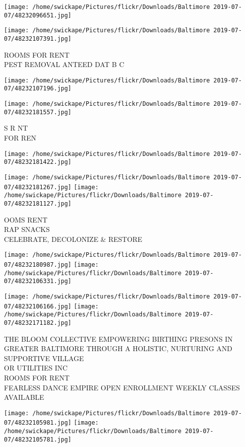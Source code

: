 \documentclass[10pt,letterpaper]{article}
\begin{document}
\texttt{[image: /home/swickape/Pictures/flickr/Downloads/Baltimore 2019-07-07/48232096651.jpg]}

\vspace{0.25in}
\texttt{[image: /home/swickape/Pictures/flickr/Downloads/Baltimore 2019-07-07/48232107391.jpg]}

ROOMS FOR RENT\\
PEST REMOVAL ANTEED DAT B C
\pagebreak

\texttt{[image: /home/swickape/Pictures/flickr/Downloads/Baltimore 2019-07-07/48232107196.jpg]}

\vspace{0.25in}
\texttt{[image: /home/swickape/Pictures/flickr/Downloads/Baltimore 2019-07-07/48232181557.jpg]}

S R NT\\
FOR REN
\pagebreak

\texttt{[image: /home/swickape/Pictures/flickr/Downloads/Baltimore 2019-07-07/48232181422.jpg]}

\vspace{0.25in}
\texttt{[image: /home/swickape/Pictures/flickr/Downloads/Baltimore 2019-07-07/48232181267.jpg]}
\texttt{[image: /home/swickape/Pictures/flickr/Downloads/Baltimore 2019-07-07/48232181127.jpg]}

OOMS RENT\\
RAP SNACKS\\
CELEBRATE, DECOLONIZE \& RESTORE
\pagebreak

\texttt{[image: /home/swickape/Pictures/flickr/Downloads/Baltimore 2019-07-07/48232180987.jpg]}
\texttt{[image: /home/swickape/Pictures/flickr/Downloads/Baltimore 2019-07-07/48232106331.jpg]}

\texttt{[image: /home/swickape/Pictures/flickr/Downloads/Baltimore 2019-07-07/48232106166.jpg]}
\texttt{[image: /home/swickape/Pictures/flickr/Downloads/Baltimore 2019-07-07/48232171182.jpg]}

THE BLOOM COLLECTIVE EMPOWERING BIRTHING PRESONS IN GREATER BALTIMORE THROUGH A HOLISTIC, NURTURING AND SUPPORTIVE VILLAGE\\
OR UTILITIES INC\\
ROOMS FOR RENT\\
FEARLESS DANCE EMPIRE OPEN ENROLLMENT WEEKLY CLASSES AVAILABLE
\pagebreak

\texttt{[image: /home/swickape/Pictures/flickr/Downloads/Baltimore 2019-07-07/48232105981.jpg]}
\texttt{[image: /home/swickape/Pictures/flickr/Downloads/Baltimore 2019-07-07/48232105781.jpg]}
\end{document}
